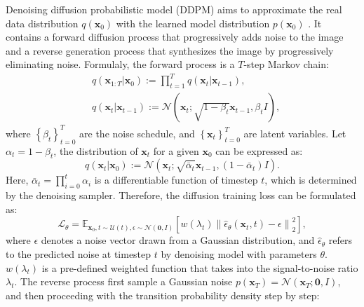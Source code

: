 Denoising diffusion probabilistic model (DDPM) \cite{ho2020denoising} aims to approximate the real data distribution $q\left(\mathbf{x}_{0}\right) $ with the learned model distribution $p\left(\mathbf{x}_{0}\right) $ \cite{ho2020denoising}. It contains a forward diffusion process that progressively adds noise to the image and a reverse generation process that synthesizes the image by progressively eliminating noise. Formulaly, the forward process is a $T$-step Markov chain:
\begin{equation}
\begin{split}                   
    &q\left(\mathbf{x}_{1:T}|\mathbf{x}_{0}\right):=\prod_{t=1}^{T}q\left(\mathbf{x}_{t}|\mathbf{x}_{t-1}\right), \\
    &q\left(\mathbf{x}_{t}|\mathbf{x}_{t-1}\right):=\mathcal{N}\left(\mathbf{x}_{t};\sqrt{1-\beta_{t}}\mathbf{x}_{t-1},\beta_{t}\boldsymbol{\mathit{I}}\right),
\end{split}
\end{equation}
where $\left\{\beta_{t}\right\}_{t=0}^{T}$ are the noise schedule, and $\left\{\mathbf{x}_{t}\right\}_{t=0}^{T}$ are latent variables. Let $\alpha_{t}=1-\beta_{t}$, the distribution of $\mathbf{x}_{t}$ for a given $\mathbf{x}_{0}$ can be expressed as:
\begin{equation}
    q\left(\mathbf{x}_{t}|\mathbf{x}_{0}\right):=\mathcal{N}\left(\mathbf{x}_{t};\sqrt{\bar{\alpha}_{t}}\mathbf{x}_{t-1},\left(1-\bar{\alpha}_{t}\right)\boldsymbol{\mathit{I}}\right).
\label{eq:ddpm_forward}
\end{equation}
Here, $\bar{\alpha}_{t}=\prod_{i=0}^{t}\alpha_{i}$ is a differentiable function of timestep $t$, which is determined by the denoising sampler. Therefore, the diffusion training loss can be formulated as:
\begin{equation}
    \mathcal{L}_{\theta}=\mathbb{E}_{\mathbf{x}_{0},t\sim\mathcal{U}\left(t\right),\epsilon\sim\mathcal{N}\left(\mathbf{0},\boldsymbol{\mathit{I}}\right)}\left[w\left(\lambda_t\right)\left\|\hat{\epsilon}_{\theta}\left(\mathbf{x}_t,t\right)-\epsilon\right\|_{2}^{2}\right],
\label{eq:optimization_object}
\end{equation}
where $\epsilon$ denotes a noise vector drawn from a Gaussian distribution, and $\hat{\epsilon}_{\theta}$ refers to the predicted noise at timestep $t$ by denoising model with parameters $\theta$. $w\left(\lambda_t\right)$ is a pre-defined weighted function that takes into the signal-to-noise ratio $\lambda_t$. The reverse process first sample a Gaussian noise $p\left(\mathbf{x}_{T}\right)=\mathcal{N}\left(\mathbf{x}_{T};\mathbf{0},\boldsymbol{\mathit{I}}\right)$, and then proceeding with the transition probability density step by step:
